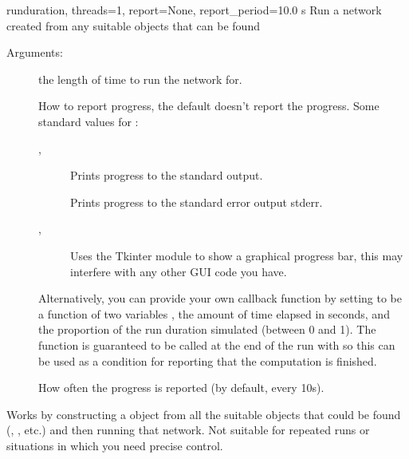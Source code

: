 \documentclass[letterpaper,10pt,english]{manual}
\begin{document}
\hypertarget{brian.run}{}\begin{funcdesc}{run}{duration, threads=1, report=None, report\_period=10.0 s}
Run a network created from any suitable objects that can be found

Arguments:
\begin{description}
\item[]
the length of time to run the network for.

\item[]
How to report progress, the default  doesn't report the
progress. Some standard values for :
\begin{description}
\item[, ]
Prints progress to the standard output.

\item[]
Prints progress to the standard error output stderr.

\item[, ]
Uses the Tkinter module to show a graphical progress bar,
this may interfere with any other GUI code you have.

\end{description}

Alternatively, you can provide your own callback function by
setting  to be a function 
of two variables , the amount of time elapsed in
seconds, and  the proportion of the run duration
simulated (between 0 and 1). The  function is
guaranteed to be called at the end of the run with
 so this can be used as a condition for
reporting that the computation is finished.

\item[]
How often the progress is reported (by default, every 10s).

\end{description}

Works by constructing a \hyperlink{brian.MagicNetwork}{} object from all the suitable
objects that could be found (\hyperlink{brian.NeuronGroup}{}, \hyperlink{brian.Connection}{}, etc.) and
then running that network. Not suitable for repeated runs or situations
in which you need precise control.
\end{funcdesc}
\end{document}

